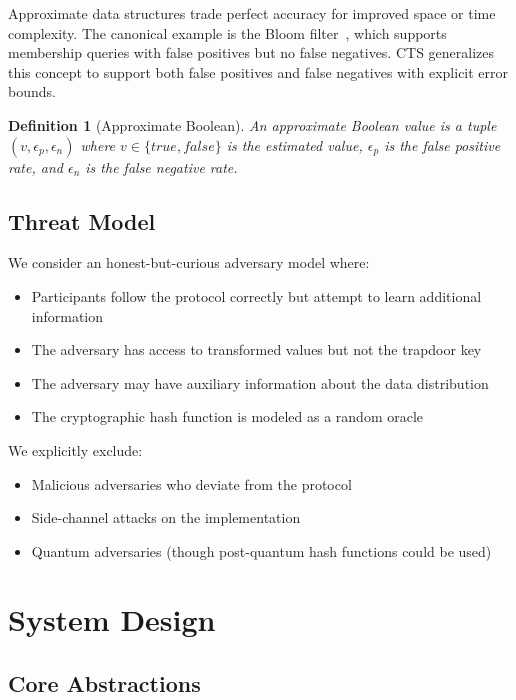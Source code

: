\documentclass[10pt,conference]{IEEEtran}
\newtheorem{definition}[theorem]{Definition}
\begin{document}
Approximate data structures trade perfect accuracy for improved space or time complexity. The canonical example is the Bloom filter~\cite{bloom1970space}, which supports membership queries with false positives but no false negatives. CTS generalizes this concept to support both false positives and false negatives with explicit error bounds.

\begin{definition}[Approximate Boolean]
An approximate Boolean value is a tuple $(v, \epsilon_p, \epsilon_n)$ where $v \in \{true, false\}$ is the estimated value, $\epsilon_p$ is the false positive rate, and $\epsilon_n$ is the false negative rate.
\end{definition}

\subsection{Threat Model}

We consider an honest-but-curious adversary model where:
\begin{itemize}
\item Participants follow the protocol correctly but attempt to learn additional information
\item The adversary has access to transformed values but not the trapdoor key
\item The adversary may have auxiliary information about the data distribution
\item The cryptographic hash function is modeled as a random oracle
\end{itemize}

We explicitly exclude:
\begin{itemize}
\item Malicious adversaries who deviate from the protocol
\item Side-channel attacks on the implementation
\item Quantum adversaries (though post-quantum hash functions could be used)
\end{itemize}

\section{System Design}
\label{sec:design}

\subsection{Core Abstractions}
\end{document}
